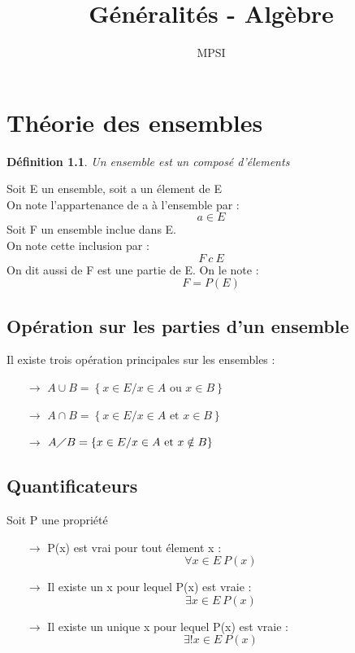 \documentclass[a4paper,12 pt,oneside]{report}     %
\title{Généralités - Algèbre}
\author{MPSI}
\newtheorem{de}{Définition}
\begin{document}
\maketitle
\tableofcontents
\chapter{Théorie des ensembles}
\begin{de}
 Un ensemble est un composé d'élements
\end{de}
Soit E un ensemble, soit a un élement de E \\
On note l'appartenance de a à l'ensemble par : $$a \in E$$
Soit F un ensemble inclue dans E.\\ On note cette inclusion par : $$F~ c~ E$$
On dit aussi de F est une partie de E. On le note :
$$F = P(E)$$
\section{Opération sur les parties d'un ensemble}
Il existe trois opération principales sur les ensembles :
\begin{itemize}
 \item[$\rightarrow$] $A \cup B = \left\lbrace x \in E / x\in A \mbox{ ou } x \in B \right\rbrace$ 
 \item[$\rightarrow$] $A \cap B = \left\lbrace x \in E / x\in A \mbox{ et } x \in B \right\rbrace$ 
 \item[$\rightarrow$] $A \diagup B = \left\lbrace x \in E / x\in A \mbox{ et } x \notin B \right\rbrace$ 
\end{itemize}
\section{Quantificateurs}
Soit P une propriété
\begin{itemize}
 \item[$\rightarrow$] P(x) est vrai pour tout élement x : $$\forall x \in E~ P(x)$$ 
 \item[$\rightarrow$] Il existe un x pour lequel P(x) est vraie : $$\exists x \in E ~ P(x)$$
 \item[$\rightarrow$] Il existe un unique x pour lequel P(x) est vraie : $$\exists ! x \in E ~ P(x)$$
\end{itemize}
\end{document}
